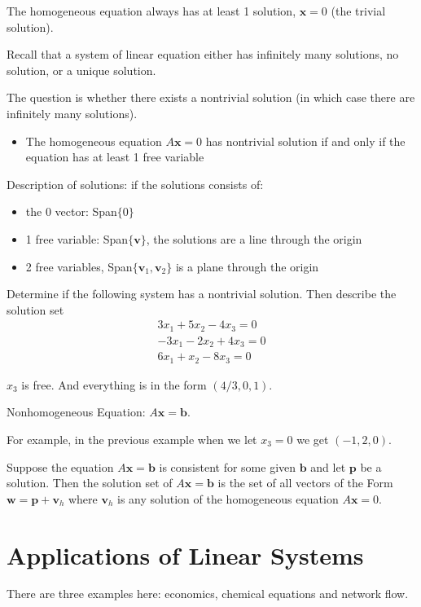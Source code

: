 \documentclass[../linalg.tex]{subfiles}
\begin{document}
The homogeneous equation always has at least 1 solution, $\textbf{x}=0$ (the trivial solution).

Recall that a system of linear equation either has infinitely many solutions, no solution, or a unique solution.

The question is whether there exists a nontrivial solution (in which case there are infinitely many solutions). 
\begin{itemize}
    \item The homogeneous equation $A\textbf{x}=0$ has nontrivial solution if and only if the equation has at least 1 free variable 
\end{itemize}
Description of solutions: if the solutions consists of:
\begin{itemize}
    \item the 0 vector: Span$\{0\}$
    \item 1 free variable: Span$\{\textbf{v}\}$, the solutions are a line through the origin 
    \item 2 free variables, Span$\{\textbf{v}_1,\textbf{v}_2\}$ is a plane through the origin
\end{itemize}
\begin{example}
    Determine if the following system has a nontrivial solution. Then describe the solution set 
    \begin{align*}
    3x_1+5x_2-4x_3=0\\
    -3x_1-2x_2+4x_3=0\\
    6x_1+x_2-8x_3=0
    \end{align*}

    $x_3$ is free. And everything is in the form $(4/3, 0, 1)$.
\end{example}

Nonhomogeneous Equation: $A\textbf{x}=\textbf{b}$.

For example, in the previous example when we let $x_3=0$ we get $(-1,2,0)$. 

\begin{theorem}
    Suppose the equation $A\textbf{x}=\textbf{b}$ is consistent for some given $\textbf{b}$ and let $\textbf{p}$ be a solution. Then the solution set of 
    $A\textbf{x}=\textbf{b}$ is the set of all vectors of the Form $\textbf{w}=\textbf{p}+\textbf{v}_h$ where $\textbf{v}_h$ is any solution of the homogeneous equation $A\textbf{x}=0$.
\end{theorem}

\section{Applications of Linear Systems}
There are three examples here: economics, chemical equations and network flow.
\end{document}
